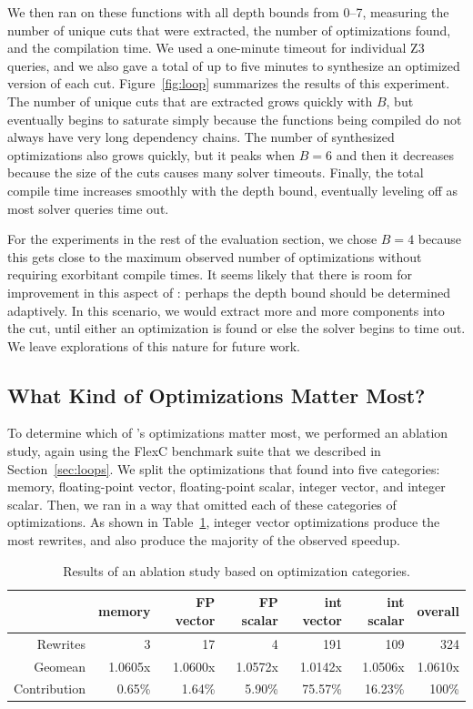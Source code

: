 We then ran \minotaur{} on these functions with all depth bounds from
0--7, measuring the number of unique cuts that were extracted, the
number of optimizations found, and the compilation time.
%
We used a one-minute timeout for individual Z3 queries, and we also
gave \minotaur{} a total of up to five minutes to synthesize an optimized
version of each cut.
%
Figure~\ref{fig:loop} summarizes the results of this experiment.
%
The number of unique cuts that are extracted grows quickly with $B$,
but eventually begins to saturate simply because the functions being
compiled do not always have very long dependency chains.
%
The number of synthesized optimizations also grows quickly, but it
peaks when $B=6$ and then it decreases because the size of the cuts
causes many solver timeouts.
%
Finally, the total compile time increases smoothly with the depth
bound, eventually leveling off as most solver queries time out.


For the experiments in the rest of the evaluation section, we chose
$B=4$ because this gets close to the maximum observed number of
optimizations without requiring exorbitant compile times.
%
It seems likely that there is room for improvement in this aspect of
\minotaur: perhaps the depth bound should be determined adaptively.
%
In this scenario, we would extract more and more components into the
cut, until either an optimization is found or else the solver begins
to time out.
%
We leave explorations of this nature for future work.


\subsection{What Kind of Optimizations Matter Most?}

To determine which of \minotaur's optimizations matter most, we performed
an ablation study, again using the FlexC benchmark suite that we
described in Section~\ref{sec:loops}.
%
We split the optimizations that \minotaur{} found into five
categories: memory, floating-point vector, floating-point scalar,
integer vector, and integer scalar.
%
Then, we ran \minotaur{} in a way that omitted each of these categories of
optimizations.
%
As shown in Table~\ref{tab:ablation}, integer vector optimizations
produce the most rewrites, and also produce the majority of the
observed speedup.

\begin{table}[bp]
  \centering
  \caption{Results of an ablation study based on optimization categories.}
  \begin{tabular}{ r | r r r r r r}
    & memory & FP vector & FP scalar& int vector & int scalar & overall \\
    \hline
    Rewrites & 3 & 17 & 4 & 191 & 109 & 324 \\
    Geomean & 1.0605x & 1.0600x & 1.0572x & 1.0142x & 1.0506x & 1.0610x \\
    Contribution & 0.65\% & 1.64\% & 5.90\% & 75.57\% & 16.23\% & 100\% \\
  \end{tabular}
  \label{tab:ablation}
\end{table}

